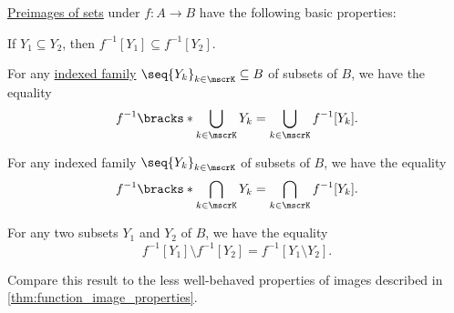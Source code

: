 \begin{proposition}\label{thm:function_preimage_properties}
  \hyperref[def:set_valued_function/inverse]{Preimages of sets} under \( f: A \to B \) have the following basic properties:
  \begin{thmenum}
     If \( Y_1 \subseteq Y_2 \), then \( f^{-1}[Y_1] \subseteq f^{-1}[Y_2] \).

     For any \hyperref[def:indexed_family]{indexed family} \( \seq{ Y_k }_{k \in \mscrK} \subseteq B \) of subsets of \( B \), we have the equality
    \begin{equation}\label{eq:thm:function_preimage_properties/union}
      f^{-1}\bracks*{ \bigcup_{k \in \mscrK} Y_k } = \bigcup_{k \in \mscrK} f^{-1}[Y_k].
    \end{equation}

     For any indexed family \( \seq{ Y_k }_{k \in \mscrK} \) of subsets of \( B \), we have the equality
    \begin{equation}\label{eq:thm:function_preimage_properties/intersection}
      f^{-1}\bracks*{ \bigcap_{k \in \mscrK} Y_k } = \bigcap_{k \in \mscrK} f^{-1}[Y_k].
    \end{equation}

     For any two subsets \( Y_1 \) and \( Y_2 \) of \( B \), we have the equality
    \begin{equation}\label{eq:thm:function_preimage_properties/difference}
      f^{-1}[Y_1] \setminus f^{-1}[Y_2] = f^{-1}[Y_1 \setminus Y_2].
    \end{equation}
  \end{thmenum}
\end{proposition}
\begin{comments}
  \item Compare this result to the less well-behaved properties of images described in \cref{thm:function_image_properties}.
\end{comments}

